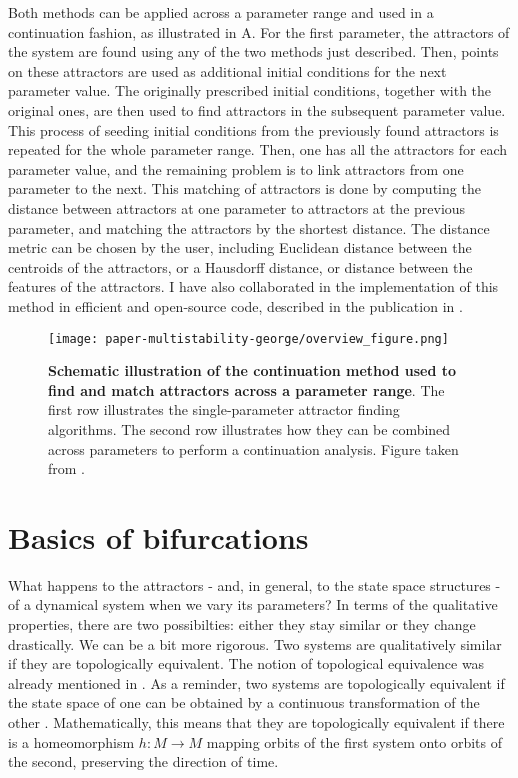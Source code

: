 Both methods can be applied across a parameter range and used in a continuation fashion, as illustrated in A. For the first parameter, the attractors of the system are found using any of the two methods just described. Then, points on these attractors are used as additional initial conditions for the next parameter value. The originally prescribed initial conditions, together with the original ones, are then used to find attractors in the subsequent parameter value. This process of seeding initial conditions from the previously found attractors is repeated for the whole parameter range. Then, one has all the attractors for each parameter value, and the remaining problem is to link attractors from one parameter to the next. This matching of attractors is done by computing the distance between attractors at one parameter to attractors at the previous parameter, and matching the attractors by the shortest distance. The distance metric can be chosen by the user, including Euclidean distance between the centroids of the attractors, or a Hausdorff distance, or distance between the features of the attractors. I have also collaborated in the implementation of this method in efficient and open-source code, described in the publication in . 
%
\begin{figure}
    \centering
    \texttt{[image: paper-multistability-george/overview\_figure.png]}
    \label{fig:method:continuation}
    \caption{\textbf{Schematic illustration of the continuation method used to find and match attractors across a parameter range}. The first row illustrates the single-parameter attractor finding algorithms. The second row illustrates how they can be combined across parameters to perform a continuation analysis. Figure taken from .}
\end{figure}


\section{Basics of bifurcations}\label{method:bifurcations}
What happens to the attractors - and, in general, to the state space structures - of a dynamical system when we vary its parameters? In terms of the qualitative properties, there are two possibilties: either they stay similar or they change drastically. We can be a bit more rigorous. Two systems are qualitatively similar if they are topologically equivalent. The notion of topological equivalence was already mentioned in . As a reminder, two systems are topologically equivalent if the state space of one can be obtained by a continuous transformation of the other \cite{kuznetsov}. Mathematically, this means that they are topologically equivalent if there is a homeomorphism $h:M \to M$ mapping orbits of the first system onto orbits of the second, preserving the direction of time. 

